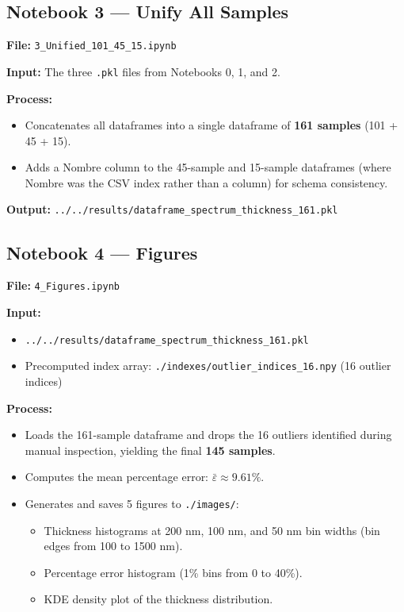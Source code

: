\documentclass[11pt,a4paper]{article}
\begin{document}
\subsection{Notebook 3 --- Unify All Samples}
\textbf{File:} {\tt 3\_Unified\_101\_45\_15.ipynb}

\textbf{Input:} The three {\tt .pkl} files from Notebooks 0, 1, and 2.

\textbf{Process:}
\begin{itemize}
    \item Concatenates all dataframes into a single dataframe of \textbf{161 samples} (101 + 45 + 15).
    \item Adds a Nombre column to the 45-sample and 15-sample dataframes (where Nombre was the CSV index rather than a column) for schema consistency.
\end{itemize}

\textbf{Output:} {\tt ../../results/dataframe\_spectrum\_thickness\_161.pkl}

\subsection{Notebook 4 --- Figures}
\textbf{File:} {\tt 4\_Figures.ipynb}

\textbf{Input:}
\begin{itemize}
    \item {\tt ../../results/dataframe\_spectrum\_thickness\_161.pkl}
    \item Precomputed index array: {\tt ./indexes/outlier\_indices\_16.npy} (16 outlier indices)
\end{itemize}

\textbf{Process:}
\begin{itemize}
    \item Loads the 161-sample dataframe and drops the 16 outliers identified during manual inspection, yielding the final \textbf{145 samples}.
    \item Computes the mean percentage error: $\bar{\varepsilon} \approx 9.61\%$.
    \item Generates and saves 5 figures to {\tt ./images/}:
    \begin{itemize}
        \item Thickness histograms at 200 nm, 100 nm, and 50 nm bin widths (bin edges from 100 to 1500 nm).
        \item Percentage error histogram (1\% bins from 0 to 40\%).
        \item KDE density plot of the thickness distribution.
    \end{itemize}
\end{itemize}
\end{document}
